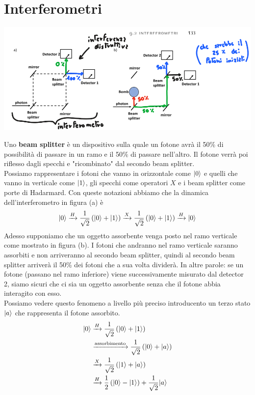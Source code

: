 \documentclass[12pt, a4paper]{report}
\begin{document}
\section{Interferometri}
\begin{center}
    \includegraphics[width=.7\textwidth]{Immagini/interferometri.png}
\end{center}
Uno \textbf{beam splitter} è un dispositivo sulla quale un fotone avrà il 50\% di possibilità di passare in un ramo e il 50\% di passare nell'altro. Il fotone verrà poi riflesso dagli specchi e "ricombinato" dal secondo beam splitter.\\
Possiamo rappresentare i fotoni che vanno in orizzontale come $| 0 \rangle$ e quelli che vanno in verticale come $| 1 \rangle$, gli specchi come operatori $X$ e i beam splitter come porte di Hadarmard. Con queste notazioni abbiamo che la dinamica dell'interferometro in figura (a) è
\begin{equation*}
    | 0 \rangle\xrightarrow{H} \frac{1}{\sqrt{2}}\left(| 0 \rangle+| 1 \rangle\right)\xrightarrow{X} \frac{1}{\sqrt{2}}\left(| 0 \rangle+| 1 \rangle\right)\xrightarrow{H} | 0 \rangle
\end{equation*}
Adesso supponiamo che un oggetto assorbente venga posto nel ramo verticale come mostrato in figura (b). I fotoni che andranno nel ramo verticale saranno assorbiti e non arriveranno al secondo beam splitter, quindi al secondo beam splitter arriverà il 50\% dei fotoni che a sua volta dividerà. In altre parole: se un fotone (passano nel ramo inferiore) viene successivamente misurato dal detector 2, siamo sicuri che ci sia un oggetto assorbente senza che il fotone abbia interagito con esso.\\
Possiamo vedere questo fenomeno a livello più preciso introducento un terzo stato $| a \rangle$ che rappresenta il fotone assorbito.
\begin{equation*}
    \begin{split}
        | 0 \rangle&\xrightarrow{H}\frac{1}{\sqrt{2}}\left(| 0 \rangle+| 1 \rangle\right)\\
        &\xrightarrow{\text{assorbimento}} \frac{1}{\sqrt{2}}\left(| 0 \rangle+| a \rangle\right) \\
        &\xrightarrow{X}\frac{1}{\sqrt{2}}\left(| 1 \rangle+| a \rangle\right) \\
        &\xrightarrow{H}\frac{1}{2}\left(| 0 \rangle-| 1 \rangle\right) + \frac{1}{\sqrt{2}}| a \rangle
    \end{split}
\end{equation*}
\end{document}
